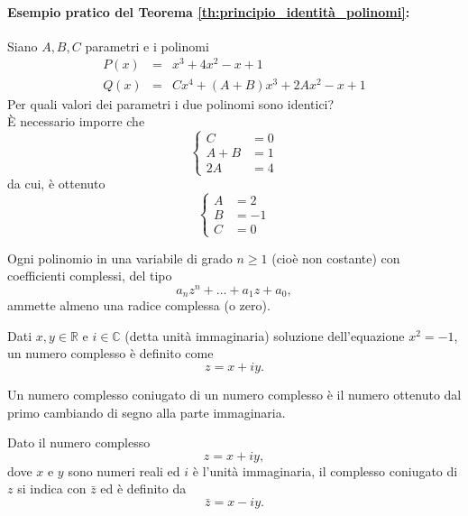 \paragraph{Esempio pratico del Teorema \ref{th:principio_identità_polinomi}:} Siano $A,B,C$ parametri e i \gls{polinomi}
\begin{equation*}
	\begin{matrix}
		P(x) &=& x^3 + 4x^2-x+1\\
		Q(x) &=& Cx^4 + (A+B)x^3+2Ax^2-x+1
	\end{matrix}
\end{equation*}
Per quali valori dei parametri i due polinomi sono identici?\\
È necessario imporre che
\begin{equation*}
	\begin{cases}
		C&=0\\
		A+B &= 1\\
		2A &= 4
	\end{cases}
\end{equation*}
da cui, è ottenuto
\begin{equation*}
	\begin{cases}
		A &= 2\\
		B &= - 1\\
		C&=0
	\end{cases}
\end{equation*}

\begin{theorem}\label{th:fondamentale_algebra}
   Ogni polinomio in una variabile di grado $n\geq 1$ (cioè non costante) con coefficienti complessi, del tipo
    \begin{equation*}
        a_{n}z^{n}+\ldots +a_{1}z+a_{0},
    \end{equation*}
    ammette almeno una radice complessa (o zero). 
\end{theorem}
\begin{definition}
    Dati $x,y\in\mathbb R$ e $i\in\mathbb C$ (detta unità immaginaria) soluzione dell'equazione $x^2=-1$, un numero complesso è definito come
    \begin{equation*}
        z=x+iy.
    \end{equation*}
\end{definition}
Un numero complesso coniugato di un numero complesso è il numero ottenuto dal primo cambiando di segno alla parte immaginaria.
\begin{definition}\label{def:complesso_coniugato}
    Dato il numero complesso
    \begin{equation*}
        z = x + i y,
    \end{equation*}
    dove $x$ e $y$ sono numeri reali ed $i$ è l'unità immaginaria, il complesso coniugato di $z$ si indica con $\bar {z}$ ed è definito da
    \begin{equation*}
        \bar {z}=x-iy.
    \end{equation*}
\end{definition}

